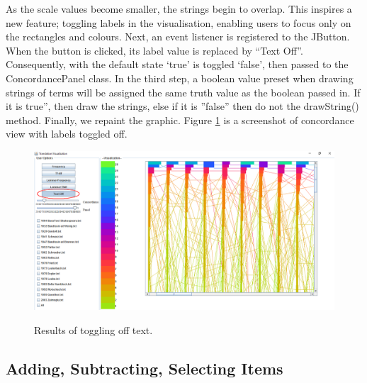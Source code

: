 As the scale values become smaller, the strings begin to overlap. This inspires a new feature; toggling labels in the visualisation, enabling users to focus only on the rectangles and colours. Next, an event listener is registered to the JButton. When the button is clicked, its label value is replaced by “Text Off”. Consequently, with the default state ‘true’ is toggled ‘false’, then passed to the ConcordancePanel class. In the third step, a boolean value preset when drawing strings of terms will be assigned the same truth value as the boolean passed in. If it is true”, then draw the strings, else if it is ”false” then do not the drawString() method. Finally, we repaint the graphic. Figure \ref{fig:textOnOff} is a screenshot of concordance view with labels toggled off.

\begin{figure}[H]
	\centering	
	\includegraphics[width=\textwidth]{Figs/Text-On-Off}\\[1ex]
	\caption{Results of toggling off text.}
	\label{fig:textOnOff}\textsl{}
\end{figure} 

\subsection{Adding, Subtracting, Selecting Items}


